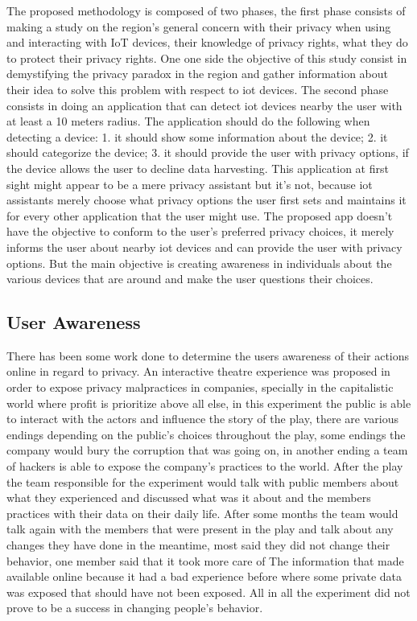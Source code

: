 \documentclass[conference]{IEEEtran}
\begin{document}
The proposed methodology is composed of two phases, the first phase consists of
making a study on the region's general concern with their privacy when
using and interacting with IoT devices, their knowledge of privacy rights, what they do to
protect their privacy rights. One one side the objective of this study
consist in demystifying the privacy paradox in the region and gather
information about their idea to solve this problem with respect
to iot devices.
The second phase consists in doing an application that can detect iot devices
nearby the user with at least a 10 meters radius. The application should
do the following when detecting a device:
1. it should show some information about the device;
2. it should categorize the device;
3. it should provide the user with privacy options, if the device allows the
user to decline data harvesting.
This application at first sight might appear to be a mere privacy assistant but
it's not, because iot assistants merely choose what privacy options
the user first sets and maintains it for every other application that the user
might use. The proposed app doesn't have the objective to conform to the
user's preferred privacy choices, it merely informs the user about nearby iot
devices and can provide the user with privacy options. But the main objective
is creating awareness in individuals about the various devices that are around
and make the user questions their choices.

\subsection{User Awareness}\label{AA}
There has been some work done to determine the users awareness of
their actions online in regard to privacy. An interactive theatre experience \cite{ColnagoInforming}
was proposed in order to expose privacy malpractices in companies,
specially in the capitalistic world where profit is prioritize
above all else, in this experiment the public is able to interact with
the actors and influence the story of the play, there are various endings depending
on the public's choices throughout the play, some endings the company would
bury the corruption that was going on, in another ending a team of hackers
is able to expose the company's practices to the world. After the play
the team responsible for the experiment would talk with public members about
what they experienced and discussed what was it about and the members
practices with their data on their daily life. After some months
the team would talk again with the members that were present in the play and
talk about any changes they have done in the meantime, most said they did
not change their behavior, one member said that it took more care of The
information that made available online because it had a bad experience before
where some private data was exposed that should have not been exposed. All in
all the experiment did not prove to be a success in changing people's behavior.
\end{document}
